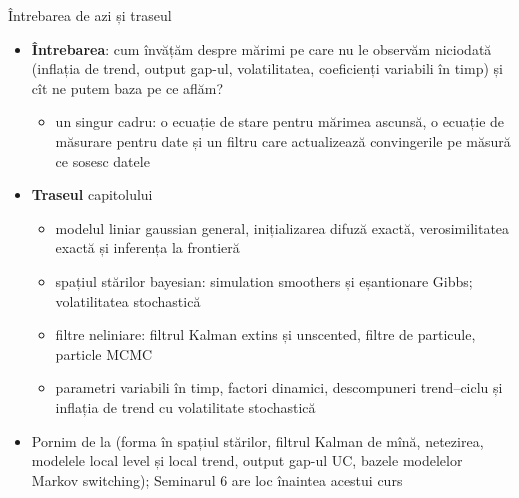 \begin{frame}{Întrebarea de azi și traseul}
\itemsize{\small}
\begin{itemize}
    \item \textbf{Întrebarea}: cum învățăm despre mărimi pe care nu le observăm niciodată (inflația de trend, output gap-ul, volatilitatea, coeficienți variabili în timp) și cît ne putem baza pe ce aflăm?
    \begin{itemize}
        \item un singur cadru: o ecuație de stare pentru mărimea ascunsă, o ecuație de măsurare pentru date și un filtru care actualizează convingerile pe măsură ce sosesc datele
    \end{itemize}
    \item \textbf{Traseul} capitolului
    \begin{itemize}
        \item modelul liniar gaussian general, inițializarea difuză exactă, verosimilitatea exactă și inferența la frontieră
        \item spațiul stărilor bayesian: simulation smoothers și eșantionare Gibbs; volatilitatea stochastică
        \item filtre neliniare: filtrul Kalman extins și unscented, filtre de particule, particle MCMC
        \item parametri variabili în timp, factori dinamici, descompuneri trend--ciclu și inflația de trend cu volatilitate stochastică
    \end{itemize}
    \item Pornim de la  (forma în spațiul stărilor, filtrul Kalman de mînă, netezirea, modelele local level și local trend, output gap-ul UC, bazele modelelor Markov switching); Seminarul 6 are loc înaintea acestui curs
\end{itemize}
\end{frame}

